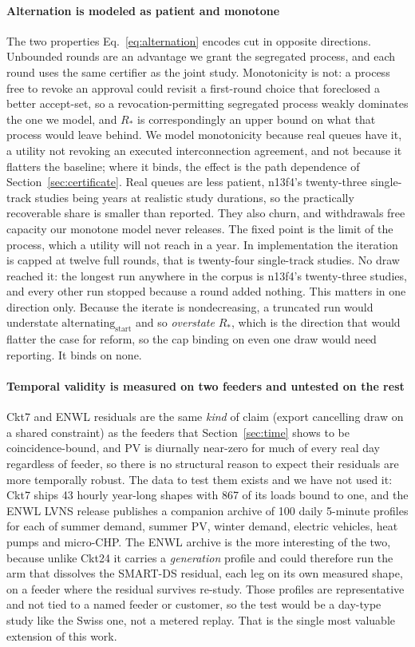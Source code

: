 \documentclass[review,authoryear,12pt]{elsarticle}
\begin{document}
\paragraph{Alternation is modeled as patient and monotone}
The two properties Eq.~\eqref{eq:alternation} encodes cut in opposite
directions. Unbounded rounds are an advantage we grant the segregated process,
and each round uses the same certifier as the joint study. Monotonicity is not:
a process free to revoke an approval could revisit a first-round choice that
foreclosed a better accept-set, so a revocation-permitting segregated process
weakly dominates the one we model, and $R_{\ast}$ is correspondingly an upper
bound on what that process would leave behind. We model monotonicity because
real queues have it, a utility not revoking an executed interconnection
agreement, and not because it flatters the baseline; where it binds, the effect
is the path dependence of Section~\ref{sec:certificate}. Real queues are less
patient, n13f4's twenty-three single-track studies being years at realistic
study durations, so the practically recoverable share is smaller than reported.
They also churn, and withdrawals free capacity our monotone model never
releases. The fixed point is the limit of the process, which a utility will
not reach in a year. In implementation the iteration is capped at twelve full
rounds, that is twenty-four single-track studies. No draw reached it: the
longest run anywhere in the corpus is n13f4's twenty-three studies, and every
other run stopped because a round added nothing. This matters in one direction
only. Because the iterate is nondecreasing, a truncated run would understate
$\text{alternating}_{\text{start}}$ and so \emph{overstate} $R_{\ast}$, which
is the direction that would flatter the case for reform, so the cap binding on
even one draw would need reporting. It binds on none.

\paragraph{Temporal validity is measured on two feeders and untested on the
rest} Ckt7 and ENWL residuals are the same \emph{kind} of claim (export
cancelling draw on a shared constraint) as the feeders that
Section~\ref{sec:time} shows to be coincidence-bound, and PV is diurnally
near-zero for much of every real day regardless of feeder, so there is no
structural reason to expect their residuals are more temporally robust. The
data to test them exists and we have not used it: Ckt7 ships 43 hourly
year-long shapes with 867 of its loads bound to one, and the ENWL LVNS release
publishes a companion archive of 100 daily 5-minute profiles for each of summer
demand, summer PV, winter demand, electric vehicles, heat pumps and micro-CHP.
The ENWL archive is the more interesting of the two, because unlike Ckt24 it
carries a \emph{generation} profile and could therefore run the arm that
dissolves the SMART-DS residual, each leg on its own measured shape, on a
feeder where the residual survives re-study. Those profiles are representative
and not tied to a named feeder or customer, so the test would be a day-type
study like the Swiss one, not a metered replay. That is the single most
valuable extension of this work.
\end{document}
